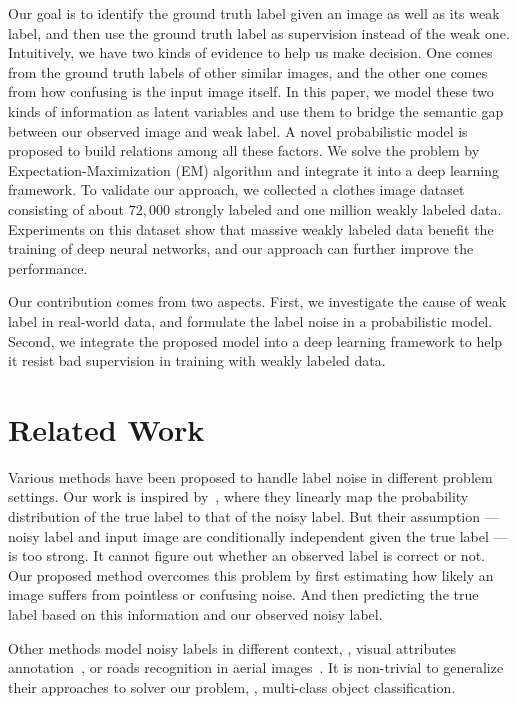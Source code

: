 \documentclass[10pt,twocolumn,letterpaper]{article}
\begin{document}
Our goal is to identify the ground truth label given an image as well as its weak label, and then use the ground truth label as supervision instead of the weak one. Intuitively, we have two kinds of evidence to help us make decision. One comes from the ground truth labels of other similar images, and the other one comes from how confusing is the input image itself. In this paper, we model these two kinds of information as latent variables and use them to bridge the semantic gap between our observed image and weak label. A novel probabilistic model is proposed to build relations among all these factors. We solve the problem by Expectation-Maximization (EM) algorithm and integrate it into a deep learning framework. To validate our approach, we collected a clothes image dataset consisting of about $72,000$ strongly labeled and one million weakly labeled data. Experiments on this dataset show that massive weakly labeled data benefit the training of deep neural networks, and our approach can further improve the performance.

Our contribution comes from two aspects. First, we investigate the cause of weak label in real-world data, and formulate the label noise in a probabilistic model. Second, we integrate the proposed model into a deep learning framework to help it resist bad supervision in training with weakly labeled data.


\section{Related Work} %
\label{sec:related_work}
Various methods have been proposed to handle label noise in different problem settings. Our work is inspired by~\cite{sukhbaatar2014learning}, where they linearly map the probability distribution of the true label to that of the noisy label. But their assumption --- noisy label and input image are conditionally independent given the true label --- is too strong. It cannot figure out whether an observed label is correct or not. Our proposed method overcomes this problem by first estimating how likely an image suffers from pointless or confusing noise. And then predicting the true label based on this information and our observed noisy label.

Other methods model noisy labels in different context, \eg, visual attributes annotation~\cite{vahdat2013handling}, or roads recognition in aerial images~\cite{mnih2012learning}. It is non-trivial to generalize their approaches to solver our problem, \ie, multi-class object classification.
\end{document}
